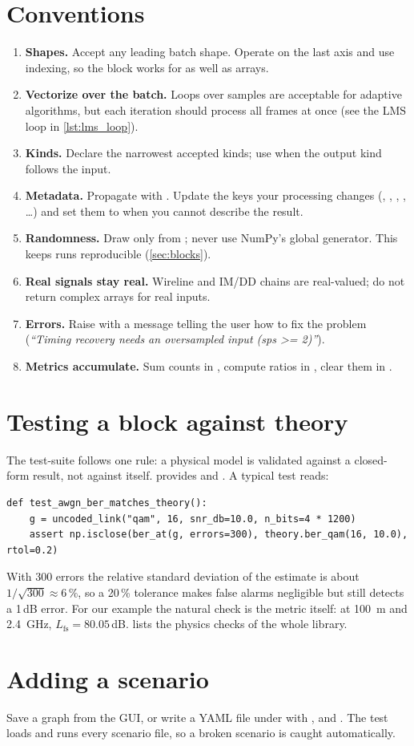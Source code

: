 \section{Conventions}
\begin{enumerate}[label=\textbf{C\arabic*.}]
  \item \textbf{Shapes.} Accept any leading batch shape. Operate on the last axis and use
   indexing, so the block works for  as well as  arrays.
  \item \textbf{Vectorize over the batch.} Loops over samples are acceptable for adaptive
  algorithms, but each iteration should process all frames at once (see the LMS loop in
  \cref{lst:lms_loop}).
  \item \textbf{Kinds.} Declare the narrowest accepted kinds; use  when the
  output kind follows the input.
  \item \textbf{Metadata.} Propagate with . Update the keys your processing
  changes (, , , , \dots) and set them to
   when you cannot describe the result.
  \item \textbf{Randomness.} Draw only from ; never use NumPy's global
  generator. This keeps runs reproducible (\cref{sec:blocks}).
  \item \textbf{Real signals stay real.} Wireline and IM/DD chains are real-valued; do not
  return complex arrays for real inputs.
  \item \textbf{Errors.} Raise  with a message telling the user how to fix the
  problem (\emph{``Timing recovery needs an oversampled input (sps >= 2)''}).
  \item \textbf{Metrics accumulate.} Sum counts in , compute ratios in
  , clear them in .
\end{enumerate}

\section{Testing a block against theory}
The test-suite follows one rule: a physical model is validated against a closed-form result,
not against itself.  provides  and . A
typical test reads:
\begin{lstlisting}[style=py,numbers=none]
def test_awgn_ber_matches_theory():
    g = uncoded_link("qam", 16, snr_db=10.0, n_bits=4 * 1200)
    assert np.isclose(ber_at(g, errors=300), theory.ber_qam(16, 10.0), rtol=0.2)
\end{lstlisting}
With 300 errors the relative standard deviation of the estimate is about $1/\sqrt{300}\approx
6\,\%$, so a 20\,\% tolerance makes false alarms negligible but still detects a 1\,dB error. For
our example the natural check is the metric itself: at \SI{100}{m} and \SI{2.4}{GHz},
$L_{\mathrm{fs}}=80.05$\,dB.  lists the physics checks of the whole library.

\section{Adding a scenario}
Save a graph from the GUI, or write a YAML file under 
with ,  and . The test
 loads and runs every scenario file, so a broken scenario is
caught automatically.
